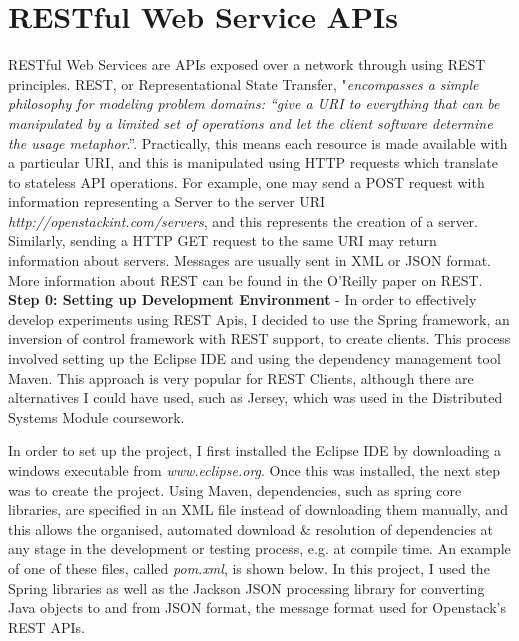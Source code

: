 \section{RESTful Web Service APIs}

RESTful Web Services are APIs exposed over a network through using REST principles. REST, or Representational State Transfer, "\textit{encompasses a simple philosophy for modeling problem domains: “give a URI to everything that can be manipulated by a limited set of operations and let the client software determine the usage metaphor}.”\cite{restoreilly}. Practically, this means each resource is made available with a particular URI, and this is manipulated using HTTP requests which translate to stateless API operations. For example, one may send a POST request with information representing a Server to the server URI \textit{http://openstackint.com/servers}, and this represents the creation of a server. Similarly, sending a HTTP GET request to the same URI may return information about servers. Messages are usually sent in XML or JSON format. More information about REST can be found in the O'Reilly paper on REST\cite{restoreilly}. \\ 

\textbf{Step 0: Setting up Development Environment} - In order to effectively develop experiments using REST Apis, I decided to use the Spring framework\cite{springframework}, an inversion of control framework with REST support, to create clients. This process involved setting up the Eclipse IDE\cite{eclipseide} and using the dependency management tool Maven\cite{maven}. This approach is very popular for REST Clients, although there are alternatives I could have used, such as Jersey\cite{jersey}, which was used in the Distributed Systems Module coursework. 

In order to set up the project, I first installed the Eclipse IDE by downloading a windows executable from \textit{www.eclipse.org}\cite{eclipseide}. Once this was installed, the next step was to create the project. Using Maven, dependencies, such as spring core libraries, are specified in an XML file instead of downloading them manually, and this allows the organised, automated download \& resolution of dependencies at any stage in the development or testing process, e.g. at compile time. An example of one of these files, called \textit{pom.xml}, is shown below. In this project, I used the Spring libraries as well as the Jackson JSON processing library\cite{jackson} for converting Java objects to and from JSON format, the message format used for Openstack's REST APIs.  

